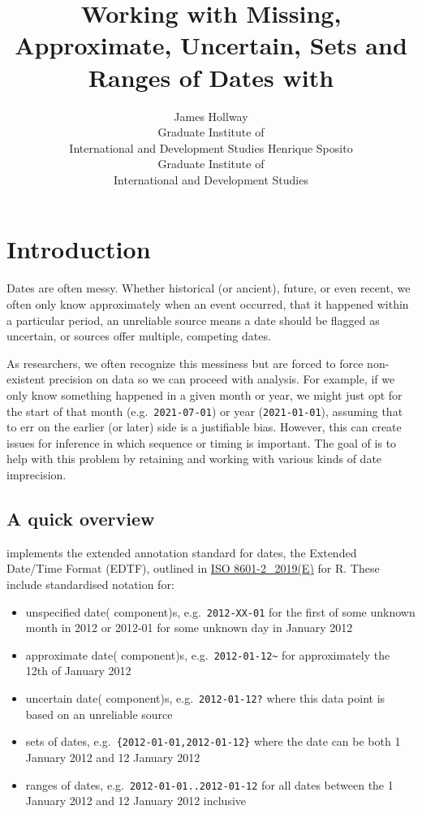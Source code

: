 \documentclass[
]{jss}
\author{
James Hollway\\Graduate Institute of\\
International and Development Studies \And Henrique Sposito\\Graduate
Institute of\\
International and Development Studies
}
\title{Working with Missing, Approximate, Uncertain, Sets and Ranges of
Dates with \pkg{messydates}}
\providecommand{\tightlist}{%
  \setlength{\itemsep}{0pt}\setlength{\parskip}{0pt}}
\begin{document}
\hypertarget{introduction}{%
\section{Introduction}\label{introduction}}

Dates are often messy. Whether historical (or ancient), future, or even
recent, we often only know approximately when an event occurred, that it
happened within a particular period, an unreliable source means a date
should be flagged as uncertain, or sources offer multiple, competing
dates.

As researchers, we often recognize this messiness but are forced to
force non-existent precision on data so we can proceed with analysis.
For example, if we only know something happened in a given month or
year, we might just opt for the start of that month
(e.g.~\texttt{2021-07-01}) or year (\texttt{2021-01-01}), assuming that
to err on the earlier (or later) side is a justifiable bias. However,
this can create issues for inference in which sequence or timing is
important. The goal of  is to help with this problem by
retaining and working with various kinds of date imprecision.

\hypertarget{a-quick-overview}{%
\subsection{A quick overview}\label{a-quick-overview}}

 implements the extended annotation standard for dates,
the Extended Date/Time Format (EDTF), outlined in
\href{https://www.iso.org/standard/70908.html}{ISO 8601-2\_2019(E)} for
R. These include standardised notation for:

\begin{itemize}
\tightlist
\item
  unspecified date( component)s, e.g.~\texttt{2012-XX-01} for the first
  of some unknown month in 2012 or 2012-01 for some unknown day in
  January 2012
\item
  approximate date( component)s,
  e.g.~\texttt{2012-01-12\textasciitilde{}} for approximately the 12th
  of January 2012
\item
  uncertain date( component)s, e.g.~\texttt{2012-01-12?} where this data
  point is based on an unreliable source
\item
  sets of dates, e.g.~\texttt{\{2012-01-01,2012-01-12\}} where the date
  can be both 1 January 2012 and 12 January 2012
\item
  ranges of dates, e.g.~\texttt{2012-01-01..2012-01-12} for all dates
  between the 1 January 2012 and 12 January 2012 inclusive
\end{itemize}
\end{document}
